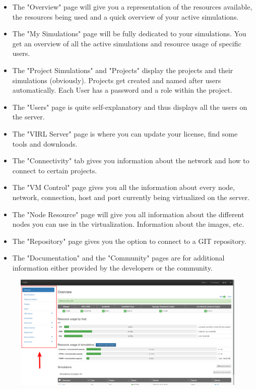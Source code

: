 \documentclass{article}
\begin{document}
\begin{itemize}
	\item The "Overview" page will give you a representation of the resources available, the resources being used and a quick overview of your active simulations.
	\item The "My Simulations" page will be fully dedicated to your simulations. You get an overview of all the active simulations and resource usage of specific users.
	\item The "Project Simulations" and "Projects" display the projects and their simulations (obviously). Projects get created and named after users automatically. Each User has a password and a role within the project.
	\item The "Users" page is quite self-explanatory and thus displays all the users on the server.
	\item The "VIRL Server" page is where you can update your license, find some tools and downloads.
	\item The "Connectivity" tab gives you information about the network and how to connect to certain projects.
	\item The "VM Control" page gives you all the information about every node, network, connection, host and port currently being virtualized on the server.
	\item The "Node Resource" page will give you all information about the different nodes you can use in the virtualization. Information about the images, etc.
	\item The "Repository" page gives you the option to connect to a GIT repository.
	\item The "Documentation" and the "Community" pages are for additional information either provided by the developers or the community.
\end{itemize}

\begin{figure}[H]
	\centering
	\includegraphics[width=\textwidth]{images/UWM_Overview.png}
\end{figure}
\end{document}
